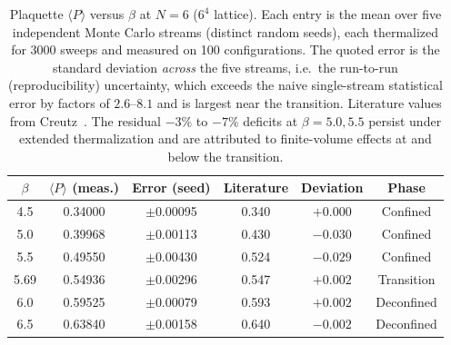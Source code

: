 \documentclass[12pt]{article}
\begin{document}
\begin{table}[ht]
\centering
\caption{Plaquette $\langle P\rangle$ versus $\beta$ at $N=6$ ($6^4$ lattice).
Each entry is the mean over five independent Monte Carlo streams (distinct
random seeds), each thermalized for 3000 sweeps and measured on 100
configurations. The quoted error is the standard deviation \emph{across}
the five streams, i.e.\ the run-to-run (reproducibility) uncertainty, which
exceeds the naive single-stream statistical error by factors of
$2.6$--$8.1$ and is largest near the transition. Literature values from
Creutz~\cite{Creutz1980}. The residual $-3\%$ to $-7\%$ deficits at
$\beta=5.0,5.5$ persist under extended thermalization and are attributed to
finite-volume effects at and below the transition.}
\label{tab:plaquette}
\begin{tabular}{@{}cccccc@{}}
  \toprule
  $\beta$ & $\langle P\rangle$ (meas.) & Error (seed)
    & Literature & Deviation & Phase \\
  \midrule
  4.5  & 0.34000 & $\pm$0.00095 & 0.340 & $+0.000$ & Confined    \\
  5.0  & 0.39968 & $\pm$0.00113 & 0.430 & $-0.030$ & Confined    \\
  5.5  & 0.49550 & $\pm$0.00430 & 0.524 & $-0.029$ & Confined    \\
  5.69 & 0.54936 & $\pm$0.00296 & 0.547 & $+0.002$ & Transition  \\
  6.0  & 0.59525 & $\pm$0.00079 & 0.593 & $+0.002$ & Deconfined  \\
  6.5  & 0.63840 & $\pm$0.00158 & 0.640 & $-0.002$ & Deconfined  \\
  \bottomrule
\end{tabular}
\end{table}
\end{document}
